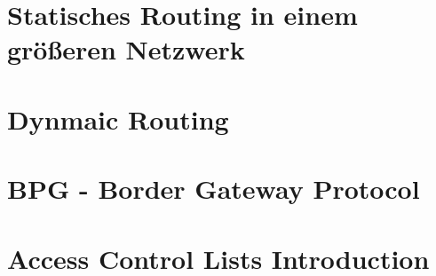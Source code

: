 \documentclass{article}
\begin{document}
	\section{Statisches Routing in einem größeren Netzwerk}
	\section{Dynmaic Routing}
	\section{BPG - Border Gateway Protocol}
	\section{Access Control Lists Introduction}
	























  
\end{document}
